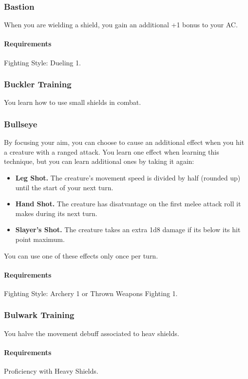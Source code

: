 \subsubsection{Bastion} \label{feat::bastion}
    When you are wielding a shield, you gain an additional +1 bonus to your AC.
    \paragraph{Requirements} Fighting Style: Dueling 1.
\subsubsection{Buckler Training} \label{feat::bucklertraining}
    You learn how to use small shields in combat.
\subsubsection{Bullseye} \label{feat::bullseye}
    By focusing your aim, you can choose to cause an additional effect when you hit a creature with a ranged attack.
    You learn one effect when learning this technique, but you can learn additional ones by taking it again:
    \begin{itemize}
        \item \textbf{Leg Shot.} The creature's movement speed is divided by half (rounded up) until the start of your next turn.
        \item \textbf{Hand Shot.} The creature has disatvantage on the first melee attack roll it makes during its next turn.
        \item \textbf{Slayer's Shot.} The creature takes an extra 1d8 damage if its below its hit point maximum.
    \end{itemize}

    You can use one of these effects only once per turn.
    \paragraph{Requirements} Fighting Style: Archery 1 or Thrown Weapons Fighting 1.
\subsubsection{Bulwark Training} \label{feat::bulwarktraining}
    You halve the movement debuff associated to heav shields.
    \paragraph{Requirements} Proficiency with Heavy Shields.
